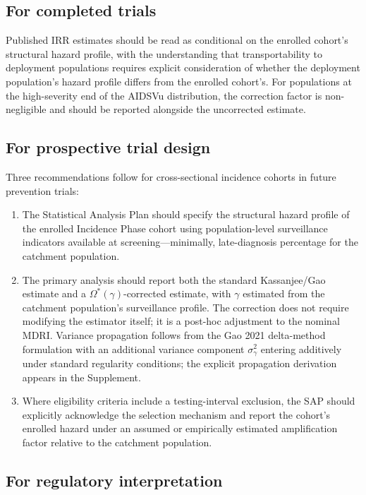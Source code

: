 \documentclass[12pt]{article}
\begin{document}
\subsection{For completed trials}

Published IRR estimates should be read as conditional on the enrolled cohort's structural hazard profile, with the understanding that transportability to deployment populations requires explicit consideration of whether the deployment population's hazard profile differs from the enrolled cohort's. For populations at the high-severity end of the AIDSVu distribution, the correction factor is non-negligible and should be reported alongside the uncorrected estimate.

\subsection{For prospective trial design}

Three recommendations follow for cross-sectional incidence cohorts in future prevention trials:

\begin{enumerate}
\item[(i)] The Statistical Analysis Plan should specify the structural hazard profile of the enrolled Incidence Phase cohort using population-level surveillance indicators available at screening---minimally, late-diagnosis percentage for the catchment population.

\item[(ii)] The primary analysis should report both the standard Kassanjee/Gao estimate and a $\Omega^*(\gamma)$-corrected estimate, with $\gamma$ estimated from the catchment population's surveillance profile. The correction does not require modifying the estimator itself; it is a post-hoc adjustment to the nominal MDRI. Variance propagation follows from the Gao 2021 delta-method formulation with an additional variance component $\sigma_\gamma^2$ entering additively under standard regularity conditions; the explicit propagation derivation appears in the Supplement.

\item[(iii)] Where eligibility criteria include a testing-interval exclusion, the SAP should explicitly acknowledge the selection mechanism and report the cohort's enrolled hazard under an assumed or empirically estimated amplification factor relative to the catchment population.
\end{enumerate}

\subsection{For regulatory interpretation}
\end{document}
